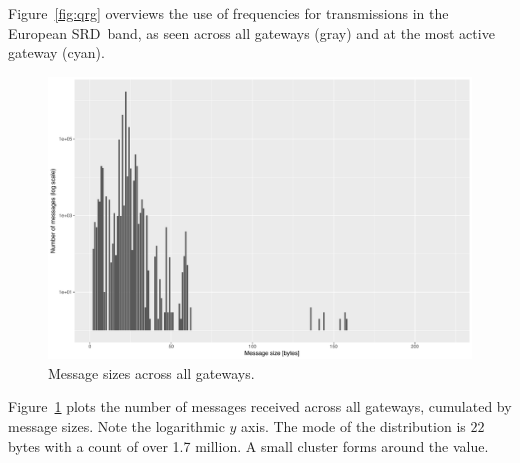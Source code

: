 Figure~\ref{fig:qrg} overviews the use of frequencies for transmissions
in the European \gls{SRD} band, as seen across all gateways (gray) and
at the most active gateway (cyan).




\begin{figure}
  \centering
  \includegraphics[width=\columnwidth]{figures/sizes.pdf}
  \caption{Message sizes across all gateways.}
  \label{fig:sizes}
\end{figure}

Figure~\ref{fig:sizes} plots the number of messages received across
all gateways, cumulated by message sizes. Note the logarithmic $y$ axis.
The mode of the distribution is $22$ bytes with a count of over 1.7 million.
A small cluster forms around the value.
